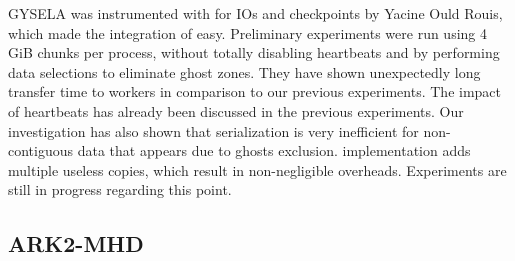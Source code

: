GYSELA was instrumented with \pdi for IOs and checkpoints by Yacine Ould Rouis, which made the integration of \deisa easy. 
Preliminary experiments were run using 4\,GiB chunks per process, without totally disabling heartbeats and by performing data selections to eliminate ghost zones.
They have shown unexpectedly long transfer time to \dask workers in comparison to our previous experiments.
The impact of heartbeats has already been discussed in the previous experiments.
Our investigation has also shown that \dask serialization is very inefficient for non-contiguous data that appears due to ghosts exclusion.
\dask implementation adds multiple useless copies, which result in non-negligible overheads.
Experiments are still in progress regarding this point.



\subsection{ARK2-MHD}

